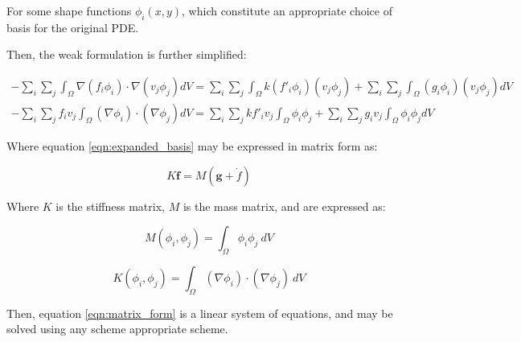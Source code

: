 For some shape functions $\phi_i(x,y)$, which constitute an appropriate choice of basis for the original PDE.

Then, the weak formulation is further simplified:

\begin{align}
    - \sum_i \sum_j \int_\Omega \nabla(f_i \phi_i) \cdot \nabla(v_j \phi_j) dV = \sum_i \sum_j \int_\Omega k (f'_i \phi_i) (v_j \phi_j) + \sum_i \sum_j \int_\Omega (g_i \phi_i) (v_j \phi_j) dV \\
    - \sum_i \sum_j f_i v_j \int_\Omega (\nabla \phi_i) \cdot (\nabla \phi_j) dV = \sum_i \sum_j k f'_i v_j \int_\Omega  \phi_i \phi_j+ \sum_i \sum_j g_i v_j \int_\Omega \phi_i \phi_j dV \label{eqn:expanded_basis}
\end{align}

Where equation \ref{eqn:expanded_basis} may be expressed in matrix form as:

\begin{equation}
K \mathbf{f} = M (\mathbf{g} + \dot{f}) \label{eqn:matrix_form}
\end{equation}

Where $K$ is the stiffness matrix, $M$ is the mass matrix, and are expressed as:

\begin{equation}
    M(\phi_i,\phi_j) = \int_{\Omega}\phi_i \phi_j~dV
    \label{eqn:mass_matrix}
\end{equation}

\begin{equation}
    K(\phi_i,\phi_j) = \int_{\Omega}(\nabla\phi_i)\cdot (\nabla\phi_j)~dV
    \label{eqn:stiffness_matrix}
\end{equation}

Then, equation \ref{eqn:matrix_form} is a linear system of equations, and may be solved using any scheme appropriate scheme.